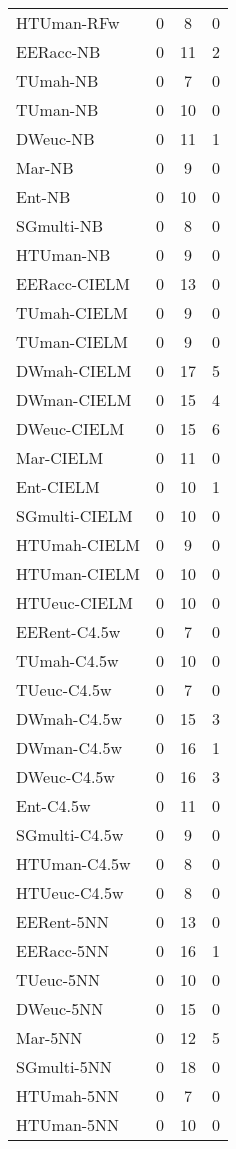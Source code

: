 \begin{table}[h]
\begin{center}
{\begin{tabular}{lccc}
HTUman-RFw & 0 & 8 & 0 \\
EERacc-NB  & 0 & 11 & 2 \\
TUmah-NB   & 0 & 7 & 0 \\
TUman-NB   & 0 & 10 & 0 \\
DWeuc-NB   & 0 & 11 & 1 \\
Mar-NB     & 0 & 9 & 0 \\
Ent-NB     & 0 & 10 & 0 \\
SGmulti-NB & 0 & 8 & 0 \\
HTUman-NB  & 0 & 9 & 0 \\
EERacc-CIELM & 0 & 13 & 0 \\
TUmah-CIELM & 0 & 9 & 0 \\
TUman-CIELM & 0 & 9 & 0 \\
DWmah-CIELM & 0 & 17 & 5 \\
DWman-CIELM & 0 & 15 & 4 \\
DWeuc-CIELM & 0 & 15 & 6 \\
Mar-CIELM  & 0 & 11 & 0 \\
Ent-CIELM  & 0 & 10 & 1 \\
SGmulti-CIELM & 0 & 10 & 0 \\
HTUmah-CIELM & 0 & 9 & 0 \\
HTUman-CIELM & 0 & 10 & 0 \\
HTUeuc-CIELM & 0 & 10 & 0 \\
EERent-C4.5w & 0 & 7 & 0 \\
TUmah-C4.5w & 0 & 10 & 0 \\
TUeuc-C4.5w & 0 & 7 & 0 \\
DWmah-C4.5w & 0 & 15 & 3 \\
DWman-C4.5w & 0 & 16 & 1 \\
DWeuc-C4.5w & 0 & 16 & 3 \\
Ent-C4.5w  & 0 & 11 & 0 \\
SGmulti-C4.5w & 0 & 9 & 0 \\
HTUman-C4.5w & 0 & 8 & 0 \\
HTUeuc-C4.5w & 0 & 8 & 0 \\
EERent-5NN & 0 & 13 & 0 \\
EERacc-5NN & 0 & 16 & 1 \\
TUeuc-5NN  & 0 & 10 & 0 \\
DWeuc-5NN  & 0 & 15 & 0 \\
Mar-5NN    & 0 & 12 & 5 \\
SGmulti-5NN & 0 & 18 & 0 \\
HTUmah-5NN & 0 & 7 & 0 \\
HTUman-5NN & 0 & 10 & 0 \\

\end{tabular}}
\end{center}
\end{table}
